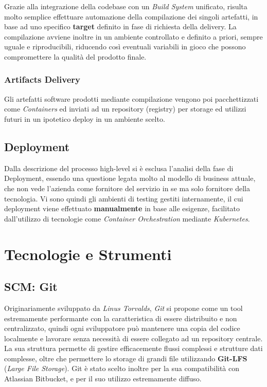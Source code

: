 \documentclass[../main.tex]{subfiles}
\begin{document}
            	    Grazie alla integrazione della codebase con un \emph{Build System} unificato, risulta molto semplice effettuare automazione della compilazione dei singoli artefatti, in base ad uno specifico \textbf{target} definito in fase di richiesta della delivery. La compilazione avviene inoltre in un ambiente controllato e definito a priori, sempre uguale e riproducibili, riducendo così eventuali variabili in gioco che possono compromettere la qualità del prodotto finale.
            	
            	\subsubsection{Artifacts Delivery}
            	    
            	    Gli artefatti software prodotti mediante compilazione vengono poi pacchettizzati come \emph{Containers} ed inviati ad un repository (registry) per storage ed utilizzi futuri in un ipotetico deploy in un ambiente scelto.
    	
        	\subsection{Deployment}
        	
        	    Dalla descrizione del processo high-level si è esclusa l'analisi della fase di Deployment, essendo una questione legata molto al modello di business attuale, che non vede l'azienda come fornitore del servizio in se ma solo fornitore della tecnologia. Vi sono quindi gli ambienti di testing gestiti internamente, il cui deployment viene effettuato \textbf{manualmente} in base alle esigenze, facilitato dall'utilizzo di tecnologie come \emph{Container Orchestration} mediante \emph{Kubernetes}.
    	
    	\section{Tecnologie e Strumenti}
    	
        	\subsection{SCM: Git}
        	
        	    Originariamente sviluppato da \emph{Linus Torvalds}, \emph{Git}\cite{git} si propone come un tool estremamente performante con la caratteristica di essere distribuito e non centralizzato, quindi ogni sviluppatore può mantenere una copia del codice localmente e lavorare senza necessità di essere collegato ad un repository centrale. La sua struttura permette di gestire efficacemente flussi complessi e strutture dati complesse, oltre che permettere lo storage di grandi file utilizzando \textbf{Git-LFS} (\emph{Large File Storage}). Git è stato scelto inoltre per la sua compatibilità con Atlassian Bitbucket, e per il suo utilizzo estremamente diffuso.
    	
\end{document}
